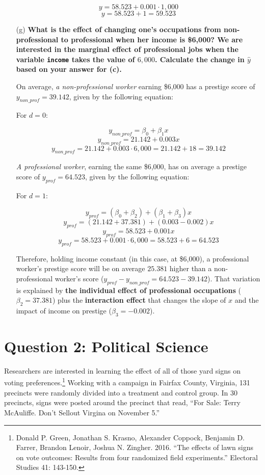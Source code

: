 \documentclass[12pt,letterpaper]{article}
\begin{document}
\begin{enumerate}
		$$y = 58.523 + 0.001 \cdot 1,000$$
		$$y = 58.523 + 1 = 59.523$$
	
	\item [(g)]
	\textbf{What is the effect of changing one's occupations from non-professional to professional when her income is \$6,000? We are interested in the marginal effect of professional jobs when the variable \texttt{income} takes the value of $6,000$. Calculate the change in $\hat{y}$ based on your answer for (c).}
	
		On average, \textit{a non-professional worker} earning \$6,000 has a prestige score of $y_{non\_prof} = 39.142$, given by the following equation:
		
		\begin{center}
			For $d = 0$:
		\end{center}
		$$y_{non\_prof} = \beta_0 + \beta_1 x$$
		$$y_{non\_prof} = 21.142 + 0.003x$$
		$$y_{non\_prof} = 21.142 + 0.003 \cdot 6,000 = 21.142 + 18 = 39.142$$
		
		\textit{A professional worker}, earning the same \$6,000, has on average a prestige score of $y_{prof} = 64.523$, given by the following equation:
		
		\begin{center}
			For $d = 1$:
		\end{center}
		$$y_{prof} = (\beta_0 + \beta_2) + (\beta_1 + \beta_3)x$$
		$$y_{prof} = (21.142 + 37.381) + (0.003 - 0.002)x$$
		$$y_{prof} = 58.523 + 0.001x$$
		$$y_{prof} = 58.523 + 0.001 \cdot 6,000 = 58.523 + 6 = 64.523$$
		
		Therefore, holding income constant (in this case, at \$6,000), a professional worker's prestige score will be on average $25.381$ higher than a non-professional worker's score ($y_{prof} - y_{non\_prof} = 64.523 - 39.142$). That variation is explained by \textbf{the individual effect of professional occupations} ($\beta_2 = 37.381$) plus the \textbf{interaction effect} that changes the slope of $x$ and the impact of income on prestige ($\beta_3 = -0.002$).
	
\end{enumerate}

\newpage

\section*{Question 2: Political Science}
\vspace{.25cm}
\noindent 	Researchers are interested in learning the effect of all of those yard signs on voting preferences.\footnote{Donald P. Green, Jonathan	S. Krasno, Alexander Coppock, Benjamin D. Farrer,	Brandon Lenoir, Joshua N. Zingher. 2016. ``The effects of lawn signs on vote outcomes: Results from four randomized field experiments.'' Electoral Studies 41: 143-150. } Working with a campaign in Fairfax County, Virginia, 131 precincts were randomly divided into a treatment and control group. In 30 precincts, signs were posted around the precinct that read, ``For Sale: Terry McAuliffe. Don't Sellout Virgina on November 5.'' \\
\end{document}
